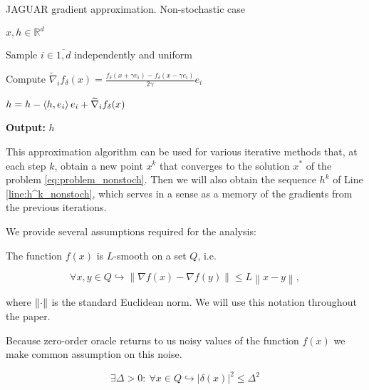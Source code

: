         \begin{algorithm}[H]
    	\caption{JAGUAR gradient approximation. Non-stochastic case}
    	\label{alg:JAGUAR_nonstoch}
        	\begin{algorithmic}[1]
        		 $x, h \in \mathbb{R}^d$
          
                \State Sample $i \in \overline{1, d}$ independently and uniform

                \State Compute $\widetilde{\nabla}_i f_{\delta}(x) = \frac{f_{\delta}(x + \gamma e_i) - f_{\delta}(x - \gamma e_i)}{2 \gamma} e_i$

                \State $h = h - \left\langle h,e_i \right\rangle e_i + \widetilde{\nabla}_i f_{\delta}(x)$ \label{line:h^k_nonstoch}
    
                \State \textbf{Output:} $h$ 
        	\end{algorithmic}
        \end{algorithm}

        This approximation algorithm can be used for various iterative methods that, at each step $k$, obtain a new point $x^k$ that converges to the solution $x^*$ of the problem \ref{eq:problem_nonstoch}. Then we will also obtain the sequence $h^k$ of Line \ref{line:h^k_nonstoch}, which serves in a sense as a memory of the gradients from the previous iterations.

        We provide several assumptions required for the analysis:
    
        \begin{assumption}[Smoothness]\label{ass:smooth_nonstoch}
            The function $f(x)$ is $L$-smooth on a set $Q$, i.e. 
            
            \begin{equation*}
                \forall x, y \in Q \hookrightarrow \left\|\nabla f(x) - \nabla f(y)\right\| \leq L \left\|x-y\right\|,
            \end{equation*}
        \end{assumption}

        where $\left\| \cdot \right\|$ is the standard Euclidean norm. We will use this notation throughout the paper.
    
        Because zero-order oracle returns to us noisy values of the function $f(x)$ we make common assumption on this noise.
    
        \begin{assumption}\label{ass:bounded_nonstoch}
            \begin{equation*}
                \exists \Delta > 0 : ~\forall x \in Q \hookrightarrow |\delta(x)|^2 \leq \Delta^2
            \end{equation*}
        \end{assumption}

